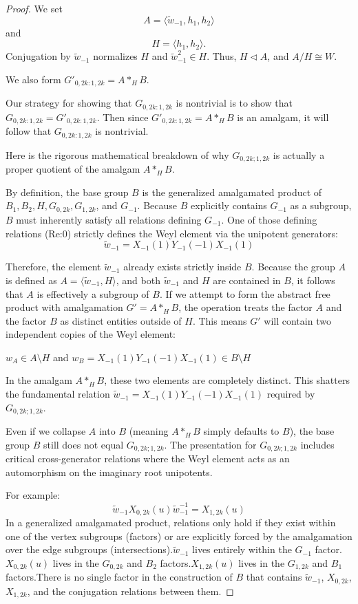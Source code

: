 \documentclass[10pt,a4paper]{amsart}
\begin{document}
{\begin{proof}
{\color{red} We set
$$A=\langle \widetilde{w}_{-1}, h_1, h_2 \rangle$$
and
$$H=\langle h_1,h_2\rangle.$$
Conjugation by $\widetilde{w}_{-1}$ normalizes $H$  and $\widetilde{w}_{-1}^2 \in H$. Thus, $H \lhd A$, and  $A/H \cong W$.

 We also form $G'_{0,2k:1,2k}=A*_H B$.
 
Our strategy for showing that $G_{0,2k:1,2k}$ is nontrivial is to show that $G_{0,2k:1,2k}=G'_{0,2k:1,2k}$. Then since $G'_{0,2k:1,2k}=A*_H B$ is an amalgam, it will follow that $G_{0,2k:1,2k}$ is nontrivial.


Here is the rigorous mathematical breakdown of why $G_{0,2k;1,2k}$ is actually a proper quotient of the amalgam $A *_H B$.

By definition, the base group $B$ is the generalized amalgamated product of $B_1, B_2, H, G_{0,2k}, G_{1,2k}$, and $G_{-1}$. Because $B$ explicitly contains $G_{-1}$ as a subgroup, $B$ must inherently satisfy all relations defining $G_{-1}$. One of those defining relations (Re:0) strictly defines the Weyl element via the unipotent generators:
$$\widetilde{w}_{-1} = X_{-1}(1)Y_{-1}(-1)X_{-1}(1)$$

Therefore, the element $\widetilde{w}_{-1}$ already exists strictly inside $B$. Because the group $A$ is defined as $A = \langle \widetilde{w}_{-1}, H \rangle$, and both $\widetilde{w}_{-1}$ and $H$ are contained in $B$, it follows that $A$ is effectively a subgroup of $B$. If we attempt to form the abstract free product with amalgamation $G' = A *_H B$, the operation treats the factor $A$ and the factor $B$ as distinct entities outside of $H$. This means $G'$ will contain two independent copies of the Weyl element:

$w_A \in A \setminus H$ and $w_B = X_{-1}(1)Y_{-1}(-1)X_{-1}(1) \in B \setminus H$

In the amalgam $A *_H B$, these two elements are completely distinct. This shatters the fundamental relation $\widetilde{w}_{-1} = X_{-1}(1)Y_{-1}(-1)X_{-1}(1)$ required by $G_{0,2k;1,2k}$.

Even if we collapse $A$ into $B$ (meaning $A *_H B$ simply defaults to $B$), the base group $B$ still does not equal $G_{0,2k;1,2k}$. The presentation for $G_{0,2k;1,2k}$ includes critical cross-generator relations where the Weyl element acts as an automorphism on the imaginary root unipotents. 

For example:
$$\widetilde{w}_{-1} X_{0,2k}(u) \widetilde{w}_{-1}^{-1} = X_{1,2k}(u)$$In a generalized amalgamated product, relations only hold if they exist within one of the vertex subgroups (factors) or are explicitly forced by the amalgamation over the edge subgroups (intersections).$\widetilde{w}_{-1}$ lives entirely within the $G_{-1}$ factor.$X_{0,2k}(u)$ lives in the $G_{0,2k}$ and $B_2$ factors.$X_{1,2k}(u)$ lives in the $G_{1,2k}$ and $B_1$ factors.There is no single factor in the construction of $B$ that contains $\widetilde{w}_{-1}$, $X_{0,2k}$, $X_{1,2k}$, and the conjugation relations between them. 

}
\end{proof}}
\end{document}
